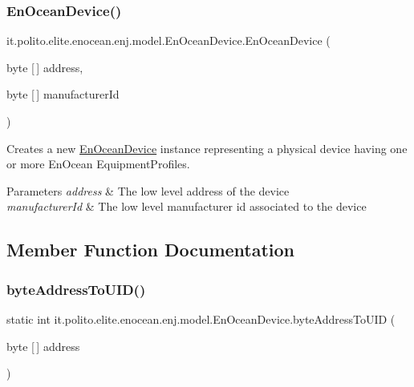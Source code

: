 \subsubsection{\texorpdfstring{En\+Ocean\+Device()}{EnOceanDevice()}}
{\footnotesize\ttfamily it.\+polito.\+elite.\+enocean.\+enj.\+model.\+En\+Ocean\+Device.\+En\+Ocean\+Device (\begin{DoxyParamCaption}\item[{byte \mbox{[}$\,$\mbox{]}}]{address,  }\item[{byte \mbox{[}$\,$\mbox{]}}]{manufacturer\+Id }\end{DoxyParamCaption})}

Creates a new \hyperlink{classit_1_1polito_1_1elite_1_1enocean_1_1enj_1_1model_1_1_en_ocean_device}{En\+Ocean\+Device} instance representing a physical device having one or more En\+Ocean Equipment\+Profiles.


\begin{DoxyParams}{Parameters}
{\em address} & The low level address of the device \\
\hline
{\em manufacturer\+Id} & The low level manufacturer id associated to the device \\
\hline
\end{DoxyParams}


\subsection{Member Function Documentation}
\hypertarget{classit_1_1polito_1_1elite_1_1enocean_1_1enj_1_1model_1_1_en_ocean_device_afb41c1bccce06b6c5a64e63b48d10470}{}\label{classit_1_1polito_1_1elite_1_1enocean_1_1enj_1_1model_1_1_en_ocean_device_afb41c1bccce06b6c5a64e63b48d10470} 
\subsubsection{\texorpdfstring{byte\+Address\+To\+U\+I\+D()}{byteAddressToUID()}}
{\footnotesize\ttfamily static int it.\+polito.\+elite.\+enocean.\+enj.\+model.\+En\+Ocean\+Device.\+byte\+Address\+To\+U\+ID (\begin{DoxyParamCaption}\item[{byte \mbox{[}$\,$\mbox{]}}]{address }\end{DoxyParamCaption})\hspace{0.3cm}{\ttfamily [static]}}

